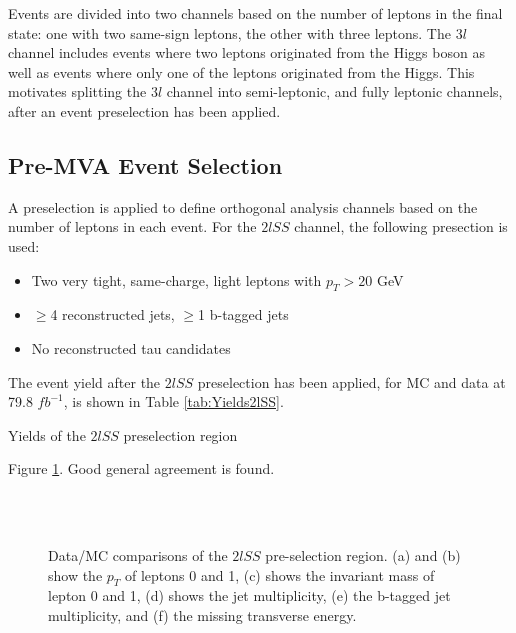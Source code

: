  Events are divided into two channels based on the number of leptons in the final state: one with two same-sign leptons, the other with three leptons. The $3l$ channel includes events where two leptons originated from the Higgs boson as well as events where only one of the leptons originated from the Higgs. This motivates splitting the $3l$ channel into semi-leptonic, and fully leptonic channels, after an event preselection has been applied.


\subsection{Pre-MVA Event Selection}
\label{subsec:preMVA}

A preselection is applied to define orthogonal analysis channels based on the number of leptons in each event. For the $2lSS$ channel, the following presection is used:

\begin{itemize}
  \item Two very tight, same-charge, light leptons with $p_T > 20$ GeV
  \item $\geq$4 reconstructed jets, $\geq$1 b-tagged jets
  \item No reconstructed tau candidates
\end{itemize}

The event yield after the $2lSS$ preselection has been applied, for MC and data at 79.8 $fb^{-1}$, is shown in Table \ref{tab:Yields2lSS}. 

\begin{table}[H]

\label{tab:Yields2lSS}
\caption{Yields of the $2lSS$ preselection region}
\end{table}

Figure \ref{fig:presel2lSS}. Good general agreement is found.

\begin{figure}[H]
    \centering
    \\
    \\
    \caption{Data/MC comparisons of the $2lSS$ pre-selection region. (a) and (b) show the $p_T$ of leptons 0 and 1, (c) shows the invariant mass of lepton 0 and 1, (d) shows the jet multiplicity, (e) the b-tagged jet multiplicity, and (f) the missing transverse energy.}                           
    \label{fig:presel2lSS}
\end{figure}

